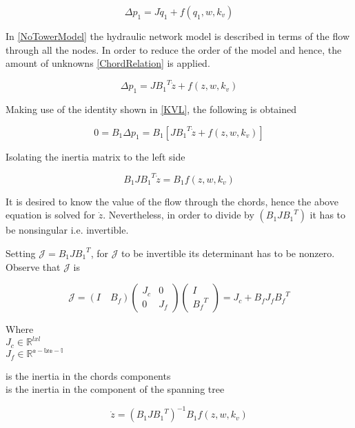 \begin{equation}
  \Delta p_1 = J \dot{q}_1 + f(q_1, w, k_v)
  \label{NoTowerModel}
\end{equation}

In \eqref{NoTowerModel} the hydraulic network model is described in terms of the 
flow through all the nodes. In order to reduce the order of the model and hence, 
the amount of unknowns \eqref{ChordRelation} is applied. 

\begin{equation}
  \Delta p_1 = J {B_1}^T \dot{z} + f(z, w, k_v)
  \label{ChordsModel}
\end{equation}

Making use of the identity shown in \eqref{KVL}, the following is obtained

\begin{equation}
  0 = B_1 \Delta p_1 = B_1 [J {B_1}^T \dot{z} + f(z, w, k_v)] 
 \end{equation}

Isolating the inertia matrix to the left side

\begin{equation}
  B_1 J {B_1}^T \dot{z}  = B_1 f(z, w, k_v)
 \end{equation}

It is desired to know the value of the flow through the chords, hence the above equation is solved 
for $\dot{z}$. Nevertheless, in order to divide by $(B_1 J {B_1}^T)$ it has to be nonsingular i.e. invertible. 

Setting $\mathcal{J} = B_1 J {B_1}^T $, for $\mathcal{J}$ to be invertible its 
determinant has to be nonzero. Observe that $\mathcal{J}$ is

\begin{equation}
  \label{Jequation}
  \mathcal{J} = (I \quad B_f) 
  \begin{pmatrix}
    J_c    &    0    \\
    0       &    J_f
  \end{pmatrix}
  \begin{pmatrix}
    I    \\
    {B_f}^T
  \end{pmatrix}
  = J_c + B_f J_f {B_f}^T
\end{equation}

\begin{minipage}[t]{0.20\textwidth}
Where\\
\hspace*{8mm} $J_c \in \mathbb{R}^{lxl}$  \\
\hspace*{8mm} $J_f \in \mathbb{R^{e-lxe-l}} $ 
\end{minipage}
\begin{minipage}[t]{0.68\textwidth}
\vspace*{2mm}
\hspace*{4mm} is the inertia in the chords components\\
\hspace*{4mm} is the inertia in the component of the spanning tree 
\end{minipage}


\begin{equation}
   \dot{z}  = (B_1 J {B_1}^T)^{-1}B_1 f(z, w, k_v) 
   \label{ParatModelFinal}
 \end{equation}
